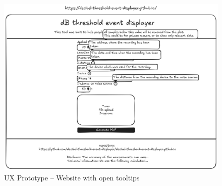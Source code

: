 \begin{figure}[H]
    \centering
    \includegraphics[width=\textwidth]{../assets/ux_prototype_website_tooltips.png}
    \caption{UX Prototype – Website with open tooltips}\label{fig:ux_prototype_website_tooltips}
\end{figure}